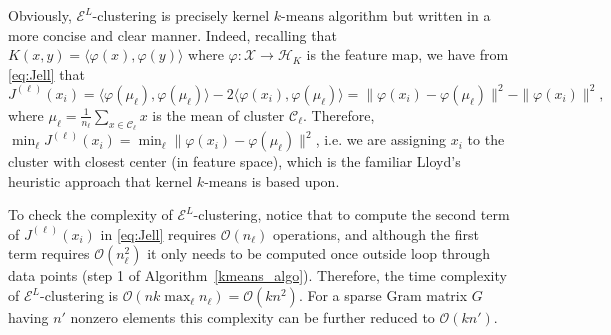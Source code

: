 \documentclass[aps,preprint,nofootinbib,floatfix]{revtex4-1}
\newcommand\kk{K}
\newcommand\C{{\mathcal{C}}}
\newcommand\OO{{\mathcal{O}}}
\begin{document}
Obviously, $\mathcal{E}^{L}$-clustering is precisely
kernel $k$-means algorithm \cite{Dhillon2,Dhillon} 
but written in a more concise and clear manner. Indeed, recalling that
$\kk(x,y)=\langle \varphi(x), \varphi(y) \rangle$ where $\varphi: \mathcal{X}
\to \mathcal{H}_\kk$ is the feature map, we have from \eqref{eq:Jell} that
\begin{equation}
J^{(\ell)}(x_i) 
= 
\langle \varphi(\mu_\ell), \varphi(\mu_\ell) \rangle
-2 \langle \varphi(x_i), \varphi(\mu_\ell) \rangle 
= 
\| \varphi(x_i) - \varphi(\mu_\ell) \|^2 - \| \varphi(x_i) \|^2,
\end{equation}
where $\mu_\ell = \tfrac{1}{n_\ell} \sum_{x\in \C_\ell}x$ 
is the mean of cluster $\C_\ell$. 
Therefore, $\min_\ell J^{(\ell)}(x_i) = 
\min_\ell \| \varphi(x_i) - \varphi(\mu_\ell)\|^2$, i.e. we are assigning
$x_i$ to the cluster with closest center (in feature space),
which is the familiar Lloyd's
heuristic approach that kernel $k$-means is based upon.

To check the complexity of $\mathcal{E}^L$-clustering, 
notice that to compute the second term of $J^{(\ell)}(x_i)$
in \eqref{eq:Jell} requires
$\OO(n_\ell)$ operations, and although the first term requires
$\OO(n_\ell^2)$ it only needs to be computed once outside loop through
data points (step 1 of Algorithm~\ref{kmeans_algo}).
Therefore, the time complexity of $\mathcal{E}^L$-clustering 
is
$\OO(n k \max_\ell n_\ell) = \OO(k n^2)$. For a sparse
Gram matrix $G$ having
$n'$ nonzero elements this complexity can be further reduced
to $\OO(k n')$. 
\end{document}
